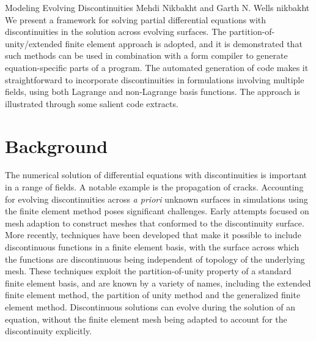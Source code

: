 \newcommand{\vect}[1]{\boldsymbol{#1}}
\newcommand{\dif}{\, d}
\newcommand{\disc}[1]{\left\llbracket {#1} \right\rrbracket}
\newcommand{\pd}{\partial}

\newcommand{\eps}{\epsilon}

              {Modeling Evolving Discontinuities}
              {Mehdi Nikbakht and Garth N. Wells}
              {nikbakht}
%
\\
We present a framework for solving partial differential equations
with discontinuities in the solution across evolving surfaces. The
partition-of-unity/extended finite element approach is adopted, and
it is demonstrated that such methods can be used in combination with
a form compiler to generate equation-specific parts of a program. The
automated generation of code makes it straightforward to incorporate
discontinuities in formulations involving multiple fields, using both
Lagrange and non-Lagrange basis functions.  The approach is illustrated
through some salient code extracts.

\section{Background}

The numerical solution of differential equations with discontinuities is
important in a range of fields. A notable example is the propagation of
cracks. Accounting for evolving discontinuities across \emph{a priori}
unknown surfaces in simulations using the finite element method poses
significant challenges.  Early attempts focused on mesh adaption to
construct meshes that conformed to the discontinuity surface.  More
recently, techniques have been developed that make it possible to include
discontinuous functions in a finite element basis, with the surface across
which the functions are discontinuous being independent of topology of
the underlying mesh. These techniques exploit the partition-of-unity
property of a standard finite element basis, and are known by a variety
of names, including the extended finite element method, the partition of unity method and the generalized finite element method.  Discontinuous solutions can evolve during the
solution of an equation, without the finite element mesh being adapted
to account for the discontinuity explicitly.

